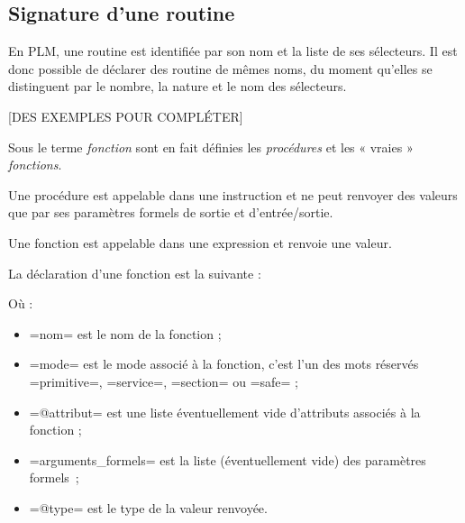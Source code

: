 \subsection{Signature d'une routine}

En PLM, une routine est identifiée par son nom et la liste de ses sélecteurs. Il est donc possible de déclarer des routine de mêmes noms, du moment qu'elles se distinguent par le nombre, la nature et le nom des sélecteurs.

[DES EXEMPLES POUR COMPLÉTER] 














 



















Sous le terme \emph{fonction} sont en fait définies les \emph{procédures} et les « vraies » \emph{fonctions}.

Une procédure est appelable dans une instruction et ne peut renvoyer des valeurs que par ses paramètres formels de sortie et d'entrée/sortie.

Une fonction est appelable dans une expression et renvoie une valeur.






La déclaration d'une fonction est la suivante :
Où :
\begin{itemize}
  \item \plm=nom= est le nom de la fonction ;
  \item \plm=mode= est le mode associé à la fonction, c'est l'un des mots réservés \plm=primitive=, \plm=service=, \plm=section= ou \plm=safe= ;
  \item \plm=@attribut= est une liste éventuellement vide d'attributs associés à la fonction ;
  \item \plm=arguments_formels= est la liste (éventuellement vide) des paramètres formels~;
  \item \plm=@type= est le type de la valeur renvoyée.
\end{itemize}


